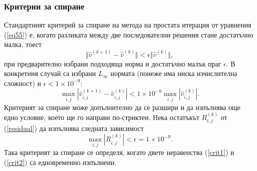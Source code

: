 \documentclass[a4paper]{article}
\newcommand{\rf}[1]{(\ref{#1})}
\theoremstyle{remark}
\begin{document}
\begin{large}
\subsubsection{Критерии за спиране}
Стандартният критерий за спиране на метода на простата итерация от уравнения \rf{eq55} е, когато разликата между две последователни решения стане достатъчно малка, тоест
\begin{equation*}
\Vert \widehat{v}^{(k+1)}-\widehat{v}^{(k)}\Vert  < \epsilon \Vert \widehat{v}^{(k)}\Vert ,
\end{equation*}
при предварително избрани подходяща норма и достатъчно малък праг $\epsilon$. В конкретния случай са избрани $L_\infty$ нормата (понеже има ниска изчислителна сложност) и $\epsilon < 1\times10^{-9}$:
\begin{equation}\label{crit1}
\max_{i,j} |\widehat{v}^{(k+1)}_{i,j}-\widehat{v}^{(k)}_{i,j}| < 1\times10^{-9} \max_{i,j} |\widehat{v}^{(k)}_{i,j}|.
\end{equation}
Критерият за спиране може допълнително да се разшири и да изпълнява още едно условие, което ще го направи по-стриктен. Нека остатъкът $R_{i,j}^{(k)}$ от \rf{residual} да изпълнява следната зависимост
\begin{equation}\label{crit2}
\max_{i,j} |R_{i,j}^{(k)}| < \epsilon = 1\times10^{-9}.
\end{equation}
Така критерият за спиране се определя, когато двете неравенства \rf{crit1} и \rf{crit2} са едновременно изпълнени.


\end{large}
\end{document}
